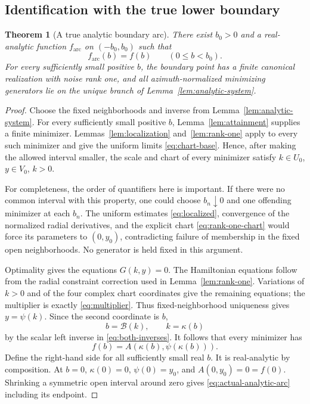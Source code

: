 \documentclass[11pt]{article}
\newtheorem{theorem}{Theorem}[section]
\theoremstyle{definition}
\theoremstyle{remark}
\begin{document}
\subsection{Identification with the true lower boundary}
\begin{theorem}[A true analytic boundary arc]\label{thm:analytic-boundary}
There exist \(b_0>0\) and a real-analytic function \(f_{\mathrm{arc}}\) on \((-b_0,b_0)\) such that
\begin{equation}\label{eq:actual-analytic-arc}
 f_{\mathrm{arc}}(b)=f(b)\qquad(0\leq b<b_0).
\end{equation}
For every sufficiently small positive \(b\), the boundary point has a finite canonical realization with noise rank one, and all azimuth-normalized minimizing generators lie on the unique branch of Lemma~\ref{lem:analytic-system}.
\end{theorem}
\begin{proof}
Choose the fixed neighborhoods and inverse from Lemma~\ref{lem:analytic-system}. For every sufficiently small positive \(b\), Lemma~\ref{lem:attainment} supplies a finite minimizer. Lemmas~\ref{lem:localization} and~\ref{lem:rank-one} apply to every such minimizer and give the uniform limits \eqref{eq:chart-base}. Hence, after making the allowed interval smaller, the scale and chart of every minimizer satisfy \(k\in U_0\), \(y\in V_0\), \(k>0\).

For completeness, the order of quantifiers here is important. If there were no common interval with this property, one could choose \(b_n\downarrow0\) and one offending minimizer at each \(b_n\). The uniform estimates \eqref{eq:localized}, convergence of the normalized radial derivatives, and the explicit chart \eqref{eq:rank-one-chart} would force its parameters to \((0,y_0)\), contradicting failure of membership in the fixed open neighborhoods. No generator is held fixed in this argument.

Optimality gives the equations \(G(k,y)=0\). The Hamiltonian equations follow from the radial constraint correction used in Lemma~\ref{lem:rank-one}. Variations of \(k>0\) and of the four complex chart coordinates give the remaining equations; the multiplier is exactly \eqref{eq:multiplier}. Thus fixed-neighborhood uniqueness gives \(y=\psi(k)\). Since the second coordinate is \(b\),
\[
 b=\mathcal B(k),\qquad k=\kappa(b)
\]
by the scalar left inverse in \eqref{eq:both-inverses}. It follows that every minimizer has
\[
 f(b)=A(\kappa(b),\psi(\kappa(b))).
\]
Define the right-hand side for all sufficiently small real \(b\). It is real-analytic by composition. At \(b=0\), \(\kappa(0)=0\), \(\psi(0)=y_0\), and \(A(0,y_0)=0=f(0)\). Shrinking a symmetric open interval around zero gives \eqref{eq:actual-analytic-arc} including its endpoint.
\end{proof}
\end{document}

